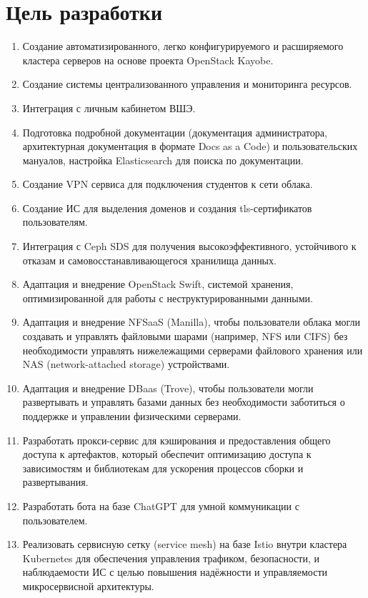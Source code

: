 \documentclass[14pt, a4paper]{extarticle}
\begin{document}
\section{Цель разработки}

\begin{enumerate}
\item Создание автоматизированного, легко конфигурируемого и расширяемого кластера серверов на основе проекта OpenStack Kayobe.
\item Создание системы централизованного управления и мониторинга ресурсов.
\item Интеграция с личным кабинетом ВШЭ.
\item Подготовка подробной документации (документация администратора, архитектурная документация в формате Docs as a Code) и пользовательских мануалов, настройка Elasticsearch для поиска по документации.
\item Создание VPN сервиса для подключения студентов к сети облака.
\item Создание ИС для выделения доменов и создания tls-сертификатов пользователям.
\item Интеграция с Ceph SDS для получения высокоэффективного, устойчивого к отказам и самовосстанавливающегося хранилища данных.
\item Адаптация и внедрение OpenStack Swift, системой хранения, оптимизированной для работы с неструктурированными данными.
\item Адаптация и внедрение NFSaaS (Manilla), чтобы пользователи облака могли создавать и управлять файловыми шарами (например, NFS или CIFS) без необходимости управлять нижележащими серверами файлового хранения или NAS (network-attached storage) устройствами.
\item Адаптация и внедрение DBaas (Trove), чтобы пользователи могли развертывать и управлять базами данных без необходимости заботиться о поддержке и управлении физическими серверами.
\item Разработать прокси-сервис для кэширования и предоставления общего доступа к артефактов, который обеспечит оптимизацию доступа к зависимостям и библиотекам для ускорения процессов сборки и развертывания.
\item Разработать бота на базе ChatGPT для умной коммуникации с пользователем.
\item Реализовать сервисную сетку (service mesh) на базе Istio внутри кластера Kubernetes для обеспечения управления трафиком, безопасности, и наблюдаемости ИС с целью повышения надёжности и управляемости микросервисной архитектуры.

\end{enumerate}
\end{document}
